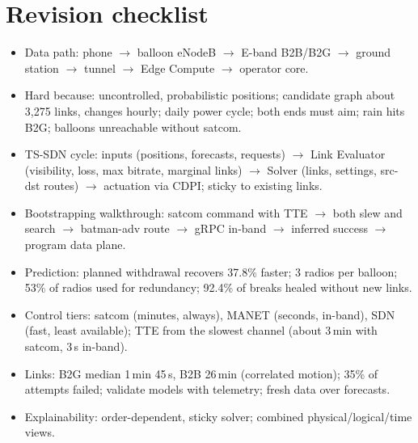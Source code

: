 \section{Revision checklist}
\begin{itemize}
  \item Data path: phone $\to$ balloon eNodeB $\to$ E-band B2B/B2G $\to$ ground station $\to$ tunnel $\to$ Edge Compute $\to$ operator core.
  \item Hard because: uncontrolled, probabilistic positions; candidate graph about 3,275 links, changes hourly; daily power cycle; both ends must aim; rain hits B2G; balloons unreachable without satcom.
  \item TS-SDN cycle: inputs (positions, forecasts, requests) $\to$ Link Evaluator (visibility, loss, max bitrate, marginal links) $\to$ Solver (links, settings, src-dst routes) $\to$ actuation via CDPI; sticky to existing links.
  \item Bootstrapping walkthrough: satcom command with TTE $\to$ both slew and search $\to$ batman-adv route $\to$ gRPC in-band $\to$ inferred success $\to$ program data plane.
  \item Prediction: planned withdrawal recovers 37.8\% faster; 3 radios per balloon; 53\% of radios used for redundancy; 92.4\% of breaks healed without new links.
  \item Control tiers: satcom (minutes, always), MANET (seconds, in-band), SDN (fast, least available); TTE from the slowest channel (about 3\,min with satcom, 3\,s in-band).
  \item Links: B2G median 1\,min 45\,s, B2B 26\,min (correlated motion); 35\% of attempts failed; validate models with telemetry; fresh data over forecasts.
  \item Explainability: order-dependent, sticky solver; combined physical/logical/time views.
\end{itemize}
